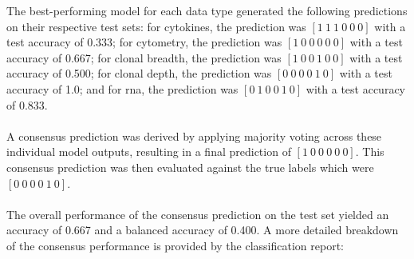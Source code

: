 \documentclass[12pt,a4paper]{report}
\begin{document}
\noindent
The best-performing model for each data type generated the following predictions on their respective test sets: for cytokines, the prediction was $[1\ 1\ 1\ 0\ 0\ 0]$ with a test accuracy of 0.333; for cytometry, the prediction was $[1\ 0\ 0\ 0\ 0\ 0]$ with a test accuracy of 0.667; for clonal breadth, the prediction was $[1\ 0\ 0\ 1\ 0\ 0]$ with a test accuracy of 0.500; for clonal depth, the prediction was $[0\ 0\ 0\ 0\ 1\ 0]$ with a test accuracy of 1.0; and for \acrshort{rna}, the prediction was $[0\ 1\ 0\ 0\ 1\ 0]$ with a test accuracy of 0.833.\\
\\
A consensus prediction was derived by applying majority voting across these individual model outputs, resulting in a final prediction of $[1\ 0\ 0\ 0\ 0\ 0]$. This consensus prediction was then evaluated against the true labels which were $[0\ 0\ 0\ 0\ 1\ 0]$.\\
\\
The overall performance of the consensus prediction on the test set yielded an accuracy of 0.667 and a balanced accuracy of 0.400. A more detailed breakdown of the consensus performance is provided by the classification report: 
\begin{table}[h!]
    \centering
    \caption[Consensus Classification Report Uncompressed Features]{Consensus Classification Report for Uncompressed Features}
    \label{tab:consensus_report_uncompressed}
\end{table}
\end{document}
